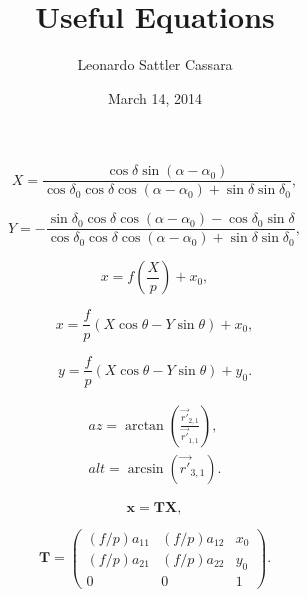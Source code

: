 \documentclass{article}
\begin{document}
\title{Useful Equations}
\author{Leonardo Sattler Cassara}
\date{March 14, 2014}
\maketitle

\begin{equation}
X= \frac{\cos \delta \sin (\alpha-\alpha_{0})}{\cos \delta_{0} \cos \delta \cos (\alpha-\alpha_{0})+\sin \delta \sin \delta_{0}} ,
\label{eq:2}
\end{equation}


\begin{equation}
Y=-\frac{\sin \delta_{0} \cos \delta \cos (\alpha-\alpha_{0})-\cos \delta_{0} \sin \delta}{\cos \delta_{0} \cos \delta \cos (\alpha-\alpha_{0})+\sin \delta \sin \delta_{0}} ,
\label{eq:3}
\end{equation}


\begin{equation}
x = f\left(\frac{X}{p}\right) + x_{0} ,
\label{eq:4}
\end{equation}


\begin{equation}
x = \frac{f}{p}\left(X\cos \theta-Y\sin \theta \right) + x_{0} ,
\label{eq:6}
\end{equation}

\begin{equation}
y = \frac{f}{p}\left(X\cos \theta-Y\sin \theta \right) + y_{0}.
\label{eq:7}
\end{equation}



\begin{equation} %
\begin{gathered}
az = \arctan{\left(\frac{\vec{r'}_{2,1}}{\vec{r'}_{1,1}}\right)}, \\
alt = \arcsin{(\vec{r'}_{3,1})}.
\end{gathered}
\label{eq:3_f}
\end{equation} 


\begin{equation}
\textbf{x}=\textbf{T}\textbf{X},
\label{eq:ta}
\end{equation}


\begin{equation}
\textbf{T} =
 \begin{pmatrix}
  (f/p)a_{11} & (f/p)a_{12} & x_{0} \\
  (f/p)a_{21} & (f/p)a_{22} & y_{0} \\  
  0 & 0 & 1
 \end{pmatrix}.
\end{equation}
\end{document}
